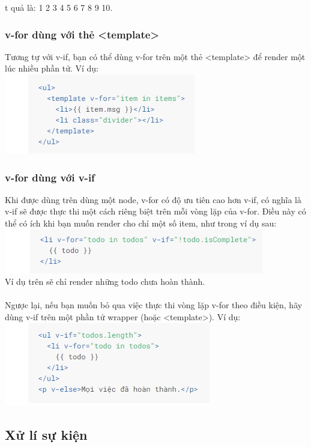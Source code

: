 \documentclass[12pt,a4paper]{report}
\begin{document}
t quả là: 1 2 3 4 5 6 7 8 9 10.
\subsubsection{v-for dùng với thẻ <template>} Tương tự với v-if, bạn có thể dùng v-for trên một thẻ <template> để render một lúc nhiều phần tử. Ví dụ: \\\includegraphics[scale=1]{51}
\subsubsection{v-for dùng với v-if}Khi được dùng trên dùng một node, v-for có độ ưu tiên cao hơn v-if, có nghĩa là v-if sẽ được thực thi một cách riêng biệt trên mỗi vòng lặp của v-for. Điều này có thể có ích khi bạn muốn render cho chỉ một số item, như trong ví dụ sau: \\\includegraphics[scale=1]{52}\\Ví dụ trên sẽ chỉ render những todo chưa hoàn thành.\\\\Ngược lại, nếu bạn muốn bỏ qua việc thực thi vòng lặp v-for theo điều kiện, hãy dùng v-if trên một phần tử wrapper (hoặc <template>). Ví dụ: \\\includegraphics[scale=1]{53}
\subsection{Xử lí sự kiện}
\end{document}
